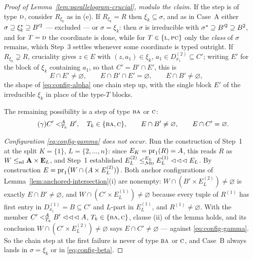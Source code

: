 \begin{proof}[Proof of Lemma~\ref{lem:parallelogram-crucial}, modulo the claim]
If the step is of type $\TD$, consider $R_{\xi_{k}}$ as in (e). If
$R_{\xi_{k}}=R$ then $\xi_{k}\subseteq\sigma$, and as in Case~A either
$\sigma\supseteq\cover{\xi_{k}}\supseteq B'^{2}$ --- excluded --- or
$\sigma=\xi_{k}$: then $\sigma$ is irreducible with
$\cover{\sigma}\supseteq B'^{2}\supseteq B^{2}$, and for $T=\TD$ the
coordinate is done, while for $T\in\{\TL,\TPC\}$ only the \emph{class} of
$\sigma$ remains, which Step~3 settles whenever some coordinate is typed
outright. If $R_{\xi_{k}}\supsetneq R$, cruciality gives $z\in E$ with
$(z,a_{1})\in\xi_{k}$, $a_{1}\in D^{(2)}_{x_{1}}\subseteq C'$; writing $E'$
for the block of $\xi_{k}$ containing $a_{1}$, so that $C'=B'\cap E'$, this
is
\begin{equation}\label{eq:config-beta}\tag{$\beta$}
  E\cap E'\neq\varnothing,\qquad E\cap B'\cap E'=\varnothing,
  \qquad E\cap B'\neq\varnothing,
\end{equation}
the shape of \eqref{eq:config-alpha} one chain step up, with the single
block $E'$ of the irreducible $\xi_{k}$ in place of the type-$T$ blocks.

The remaining possibility is a step of type $\TBA$ or $\TC$:
\begin{equation}\label{eq:config-gamma}\tag{$\gamma$}
  C'\subt[A]{T_{k}}B',\quad T_{k}\in\{\TBA,\TC\},\qquad
  E\cap B'\neq\varnothing,\qquad E\cap C'=\varnothing .
\end{equation}

\emph{Configuration \eqref{eq:config-gamma} does not occur.} Run the
construction of Step~1 at the split $K=\{1\}$, $L=\{2,\dots,n\}$: since
$E_{K}=\proj_{1}(R)=A$, this reads $R$ as
$W\sdle\mathbf A\times\mathbf E_{L}$, and Step~1 established
$E_{L}^{(2)}\subte[E_{L}]{\TMD}E_{L}^{(1)}\lll E_{L}$. By construction
$E=\proj_{1}\bigl(W\cap(A\times E_{L}^{(2)})\bigr)$. Both anchor
configurations of Lemma~\ref{lem:anchored-intersection}(i) are nonempty:
$W\cap(B'\times E_{L}^{(2)})\neq\varnothing$ is exactly
$E\cap B'\neq\varnothing$, and $W\cap(C'\times E_{L}^{(1)})\neq\varnothing$
because every tuple of $R^{(1)}$ has first entry in
$D^{(1)}_{x_{1}}=B\subseteq C'$ and $L$-part in $E_{L}^{(1)}$, and
$R^{(1)}\neq\varnothing$. With the member
$C'\subt[A]{T_{k}}B'\lll A$, $T_{k}\in\{\TBA,\TC\}$, clause (ii) of the
lemma holds, and its conclusion
$W\cap(C'\times E_{L}^{(2)})\neq\varnothing$ says $E\cap C'\neq\varnothing$
--- against \eqref{eq:config-gamma}. So the chain step at the first failure
is never of type $\TBA$ or $\TC$, and Case~B always lands in
$\sigma=\xi_{k}$ or in \eqref{eq:config-beta}.


\end{proof}
